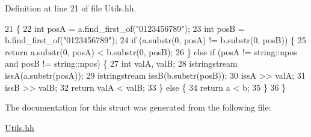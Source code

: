 Definition at line 21 of file Utils.\+hh.


\begin{DoxyCode}
21                                                            \{
22             \textcolor{keywordtype}{int} posA = a.find\_first\_of(\textcolor{stringliteral}{"0123456789"});
23             \textcolor{keywordtype}{int} posB = b.find\_first\_of(\textcolor{stringliteral}{"0123456789"});
24             \textcolor{keywordflow}{if} (a.substr(0, posA) != b.substr(0, posB)) \{
25                 \textcolor{keywordflow}{return} a.substr(0, posA) < b.substr(0, posB);
26             \} \textcolor{keywordflow}{else} \textcolor{keywordflow}{if} (posA != string::npos and posB != string::npos) \{
27                 \textcolor{keywordtype}{int} valA, valB;
28                 istringstream issA(a.substr(posA));
29                 istringstream issB(b.substr(posB));
30                 issA >> valA;
31                 issB >> valB;
32                 \textcolor{keywordflow}{return} valA < valB;
33             \} \textcolor{keywordflow}{else} \{
34                 \textcolor{keywordflow}{return} a < b;
35             \}
36         \}
\end{DoxyCode}


The documentation for this struct was generated from the following file\+:\begin{DoxyCompactItemize}
\item 
\hyperlink{_utils_8hh}{Utils.\+hh}\end{DoxyCompactItemize}
